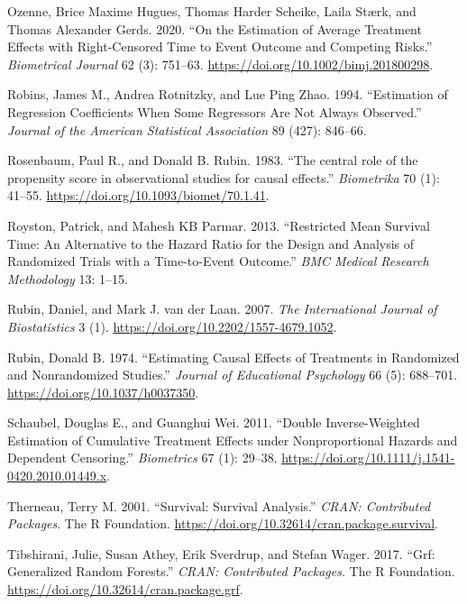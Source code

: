 \documentclass[
  11pt,
  a4paper,
]{article}
\newlength{\cslhangindent}
\newenvironment{CSLReferences}[2] %
 {\begin{list}{}{%
  \setlength{\itemindent}{0pt}
  \setlength{\leftmargin}{0pt}
  \setlength{\parsep}{0pt}
  \ifodd #1
   \setlength{\leftmargin}{\cslhangindent}
   \setlength{\itemindent}{-1\cslhangindent}
  \fi
  \setlength{\itemsep}{#2\baselineskip}}}
 {\end{list}}
\theoremstyle{plain}
\theoremstyle{plain}
\theoremstyle{plain}
\theoremstyle{definition}
\theoremstyle{remark}
\begin{document}
\begin{CSLReferences}{1}{0}
Ozenne, Brice Maxime Hugues, Thomas Harder Scheike, Laila Stærk, and
Thomas Alexander Gerds. 2020. {``On the Estimation of Average Treatment
Effects with Right-Censored Time to Event Outcome and Competing
Risks.''} \emph{Biometrical Journal} 62 (3): 751--63.
\url{https://doi.org/10.1002/bimj.201800298}.

Robins, James M., Andrea Rotnitzky, and Lue Ping Zhao. 1994.
{``Estimation of Regression Coefficients When Some Regressors Are Not
Always Observed.''} \emph{Journal of the American Statistical
Association} 89 (427): 846--66.

Rosenbaum, Paul R., and Donald B. Rubin. 1983. {``{The central role of
the propensity score in observational studies for causal effects}.''}
\emph{Biometrika} 70 (1): 41--55.
\url{https://doi.org/10.1093/biomet/70.1.41}.

Royston, Patrick, and Mahesh KB Parmar. 2013. {``Restricted Mean
Survival Time: An Alternative to the Hazard Ratio for the Design and
Analysis of Randomized Trials with a Time-to-Event Outcome.''} \emph{BMC
Medical Research Methodology} 13: 1--15.

Rubin, Daniel, and Mark J. van der Laan. 2007. \emph{The International
Journal of Biostatistics} 3 (1).
\url{https://doi.org/10.2202/1557-4679.1052}.

Rubin, Donald B. 1974. {``Estimating Causal Effects of Treatments in
Randomized and Nonrandomized Studies.''} \emph{Journal of Educational
Psychology} 66 (5): 688--701. \url{https://doi.org/10.1037/h0037350}.

Schaubel, Douglas E., and Guanghui Wei. 2011. {``{Double
Inverse-Weighted Estimation of Cumulative Treatment Effects under
Nonproportional Hazards and Dependent Censoring}.''} \emph{Biometrics}
67 (1): 29--38. \url{https://doi.org/10.1111/j.1541-0420.2010.01449.x}.

Therneau, Terry M. 2001. {``Survival: Survival Analysis.''} \emph{CRAN:
Contributed Packages}. The R Foundation.
\url{https://doi.org/10.32614/cran.package.survival}.

Tibshirani, Julie, Susan Athey, Erik Sverdrup, and Stefan Wager. 2017.
{``Grf: Generalized Random Forests.''} \emph{CRAN: Contributed
Packages}. The R Foundation.
\url{https://doi.org/10.32614/cran.package.grf}.


\end{CSLReferences}
\end{document}

